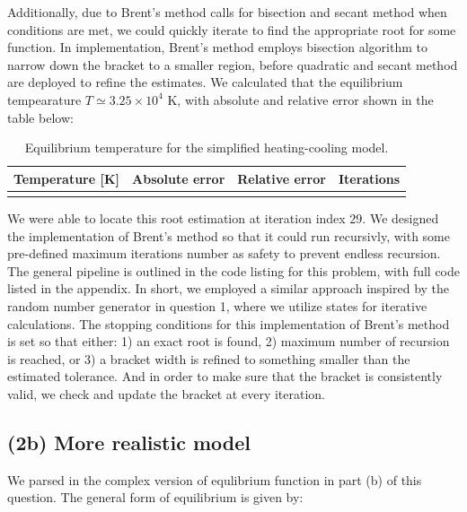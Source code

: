 \documentclass{article}
\begin{document}
    Additionally, due to Brent's method calls for bisection and secant method when 
    conditions are met, we could quickly iterate to find the appropriate root for some 
    function. In implementation, Brent's method employs bisection algorithm to narrow 
    down the bracket to a smaller region, before quadratic and secant method are 
    deployed to refine the estimates. We calculated that the equilibrium tempearature 
    $T \simeq 3.25 \times 10^4$ K, with absolute and relative error shown in the table 
    below: 
    
    \begin{table}[H]
      \centering
      \begin{tabular}{|c|c|c|c|}
        \hline
        Temperature [K] & Absolute error & Relative error & Iterations\\
        \hline
        
        \\
        \hline
      \end{tabular}
      \caption{Equilibrium temperature for the simplified heating-cooling model.}
    \end{table}

    We were able to locate this root estimation at iteration index $29$. We designed the
    implementation of Brent's method so that it could run recursivly, with some
    pre-defined maximum iterations number as safety to prevent endless recursion. The
    general pipeline is outlined in the code listing for this problem, with full code 
    listed in the appendix. In short, we employed a similar approach inspired by the 
    random number generator in question 1, where we utilize states for iterative 
    calculations. The stopping conditions for this implementation of Brent's method is
    set so that either: 1) an exact root is found, 2) maximum number of recursion is 
    reached, or 3) a bracket width is refined to something smaller than the estimated
    tolerance. And in order to make sure that the bracket is consistently valid, we 
    check and update the bracket at every iteration.

  \subsection{(2b) More realistic model}

    We parsed in the complex version of equlibrium function in part (b) of this 
    question. The general form of equilibrium is given by:
    
\end{document}
